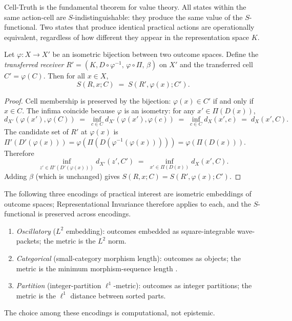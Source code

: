 \documentclass[twocolumn,11pt,a4paper]{article}
\begin{document}
\begin{remark}
\label{rem:celltruthimport}
Cell-Truth is the fundamental theorem for value theory.  All states
within the same action-cell are $S$-indistinguishable: they produce the
same value of the $S$-functional.  Two states that produce identical
practical actions are operationally equivalent, regardless of how
different they appear in the representation space $K$.
\end{remark}

\begin{theorem}
\label{thm:repinvariance}
Let $\varphi\colon X\to X'$ be an isometric bijection between two outcome
spaces.  Define the \emph{transferred receiver}
$R'=(K,D\circ\varphi^{-1},\,\varphi\circ\Pi,\,\beta)$ on $X'$ and the
transferred cell $C'=\varphi(C)$.  Then for all $x\in X$,
\[
  S(R,x;C)\;=\;S(R',\varphi(x);C').
\]
\end{theorem}

\begin{proof}
Cell membership is preserved by the bijection: $\varphi(x)\in C'$ if
and only if $x\in C$.  The infima coincide because $\varphi$ is an
isometry: for any $x'\in\Pi(D(x))$,
\[
  d_{X'}\!\left(\varphi(x'),\varphi(C)\right)
  \;=\;\inf_{c\in C}d_{X'}\!\left(\varphi(x'),\varphi(c)\right)
  \;=\;\inf_{c\in C}d_X(x',c)
  \;=\;d_X(x',C).
\]
The candidate set of $R'$ at $\varphi(x)$ is
$\Pi'(D'(\varphi(x)))=\varphi(\Pi(D(\varphi^{-1}(\varphi(x)))))
=\varphi(\Pi(D(x)))$.  Therefore
\[
  \inf_{z'\in\Pi'(D'(\varphi(x)))}d_{X'}(z',C')
  \;=\;\inf_{x'\in\Pi(D(x))}d_X(x',C).
\]
Adding $\beta$ (which is unchanged) gives $S(R,x;C)=S(R',\varphi(x);C')$.
\end{proof}

\begin{corollary}
\label{cor:threencodings}
The following three encodings of practical interest are isometric
embeddings of outcome spaces; Representational Invariance therefore
applies to each, and the $S$-functional is preserved across encodings.
\begin{enumerate}[label=(\roman*),leftmargin=*]
  \item \emph{Oscillatory} ($L^2$ embedding): outcomes embedded as
    square-integrable wave-packets; the metric is the $L^2$ norm.
  \item \emph{Categorical} (small-category morphism length): outcomes as
    objects; the metric is the minimum morphism-sequence length
    \cite{maclane1998}.
  \item \emph{Partition} (integer-partition $\ell^1$-metric): outcomes as
    integer partitions; the metric is the $\ell^1$ distance between
    sorted parts.
\end{enumerate}
The choice among these encodings is computational, not epistemic.
\end{corollary}
\end{document}
